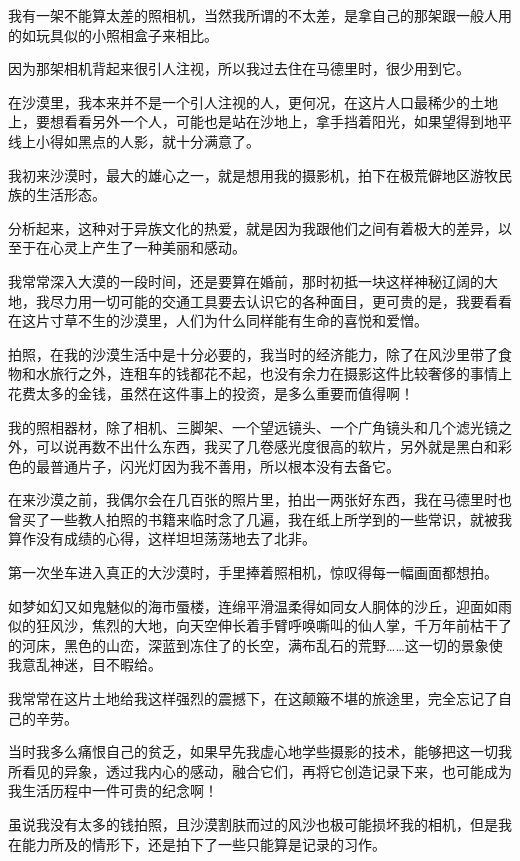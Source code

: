 \par 我有一架不能算太差的照相机，当然我所谓的不太差，是拿自己的那架跟一般人用的如玩具似的小照相盒子来相比。
\par 因为那架相机背起来很引人注视，所以我过去住在马德里时，很少用到它。
\par 在沙漠里，我本来并不是一个引人注视的人，更何况，在这片人口最稀少的土地上，要想看看另外一个人，可能也是站在沙地上，拿手挡着阳光，如果望得到地平线上小得如黑点的人影，就十分满意了。
\par 我初来沙漠时，最大的雄心之一，就是想用我的摄影机，拍下在极荒僻地区游牧民族的生活形态。
\par 分析起来，这种对于异族文化的热爱，就是因为我跟他们之间有着极大的差异，以至于在心灵上产生了一种美丽和感动。
\par 我常常深入大漠的一段时间，还是要算在婚前，那时初抵一块这样神秘辽阔的大地，我尽力用一切可能的交通工具要去认识它的各种面目，更可贵的是，我要看看在这片寸草不生的沙漠里，人们为什么同样能有生命的喜悦和爱憎。
\par 拍照，在我的沙漠生活中是十分必要的，我当时的经济能力，除了在风沙里带了食物和水旅行之外，连租车的钱都花不起，也没有余力在摄影这件比较奢侈的事情上花费太多的金钱，虽然在这件事上的投资，是多么重要而值得啊！
\par 我的照相器材，除了相机、三脚架、一个望远镜头、一个广角镜头和几个滤光镜之外，可以说再数不出什么东西，我买了几卷感光度很高的软片，另外就是黑白和彩色的最普通片子，闪光灯因为我不善用，所以根本没有去备它。
\par 在来沙漠之前，我偶尔会在几百张的照片里，拍出一两张好东西，我在马德里时也曾买了一些教人拍照的书籍来临时念了几遍，我在纸上所学到的一些常识，就被我算作没有成绩的心得，这样坦坦荡荡地去了北非。
\par 第一次坐车进入真正的大沙漠时，手里捧着照相机，惊叹得每一幅画面都想拍。
\par 如梦如幻又如鬼魅似的海市蜃楼，连绵平滑温柔得如同女人胴体的沙丘，迎面如雨似的狂风沙，焦烈的大地，向天空伸长着手臂呼唤嘶叫的仙人掌，千万年前枯干了的河床，黑色的山峦，深蓝到冻住了的长空，满布乱石的荒野……这一切的景象使我意乱神迷，目不暇给。
\par 我常常在这片土地给我这样强烈的震撼下，在这颠簸不堪的旅途里，完全忘记了自己的辛劳。
\par 当时我多么痛恨自己的贫乏，如果早先我虚心地学些摄影的技术，能够把这一切我所看见的异象，透过我内心的感动，融合它们，再将它创造记录下来，也可能成为我生活历程中一件可贵的纪念啊！
\par 虽说我没有太多的钱拍照，且沙漠割肤而过的风沙也极可能损坏我的相机，但是我在能力所及的情形下，还是拍下了一些只能算是记录的习作。
